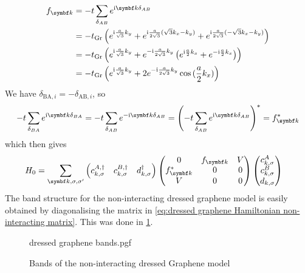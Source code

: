 \documentclass[../notes.tex]{subfiles}
\begin{document}
\begin{align}
	f_{\vb{k}} &= -t \sum_{\delta_{AB}} e^{\iu \vb{k} \delta_{AB}} \\
	&= -t_{\mathrm{Gr}} \left(
	e^{\iu \frac{a}{\sqrt{3}} k_y} +
	e^{\iu \frac{a}{2\sqrt{3}} (\sqrt{3} k_x - k_y)} +
	e^{\iu \frac{a}{2\sqrt{3}} (-\sqrt{3} k_x - k_y)} \right) \\
	&= -t_{\mathrm{Gr}} \left(
	e^{\iu \frac{a}{\sqrt{3}} k_y} +
	e^{-\iu \frac{a}{2\sqrt{3}} k_y} \left(
	e^{\iu \frac{a}{2} k_x} + e^{-\iu \frac{a}{2} k_x}
	\right) \right) \\
	&= -t_{\mathrm{Gr}} \left(
	e^{\iu \frac{a}{\sqrt{3}} k_y} +
	2 e^{-\iu \frac{a}{2\sqrt{3}} k_y}
	\cos{(\frac{a}{2} k_x)} \right)
\end{align}
We have \(\delta_{\mathrm{BA}, i} = -\delta_{\mathrm{AB}, i}\), so
\begin{align}
	-t \sum_{\delta_{BA}} e^{\iu \vb{k} \delta_{BA}} = -t \sum_{\delta_{AB}} e^{-\iu \vb{k} \delta_{AB}} = \left(-t \sum_{\delta_{AB}} e^{\iu \vb{k} \delta_{AB}}\right)^* = f_{\vb{k}}^*
\end{align}
which then gives
\begin{align}
	H_0 &= \sum_{\vb{k}, \sigma, \sigma^{\prime}} \begin{pmatrix} c_{k, \sigma}^{A, \dagger} & c_{k, \sigma}^{B, \dagger} & d_{k, \sigma}^{\dagger} \end{pmatrix}
	\begin{pmatrix}
		0 & f_{\vb{k}} & V \\
		f_{\vb{k}}^* & 0 & 0 \\
		V & 0 & 0
	\end{pmatrix} \begin{pmatrix} c_{k, \sigma}^{A} \\ c_{k, \sigma}^{B} \\ d_{k, \sigma} \end{pmatrix}
	\label{eq:dressed graphene Hamiltonian non-interacting matrix}
\end{align}
The band structure for the non-interacting dressed graphene model is easily obtained by diagonalising the matrix in \cref{eq:dressed graphene Hamiltonian non-interacting matrix}.
This was done in \cref{fig:dressed graphene model non-interacting bands}.
\begin{figure}[t]
	\centering
	 {dressed graphene bands.pgf}
	\caption{Bands of the non-interacting dressed Graphene model}
	\label{fig:dressed graphene model non-interacting bands}
\end{figure}
\end{document}

